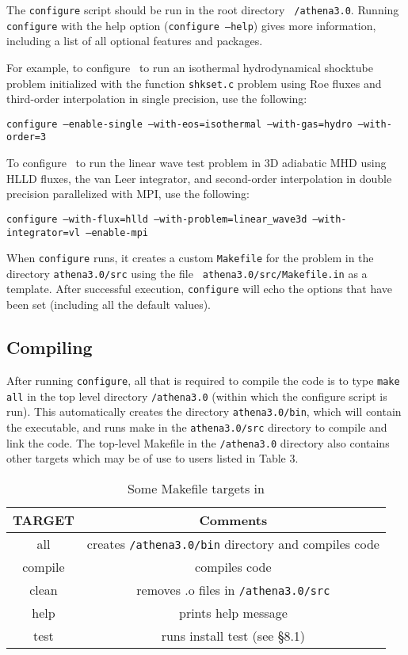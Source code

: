 The {\tt configure} script should be run in the root directory {\tt
/athena3.0}.  Running {\tt configure} with the help option ({\tt configure
--help}) gives more information, including a list of all optional features
and packages.

For example, to configure \ath\ to run an isothermal hydrodynamical shocktube
problem initialized with the function {\tt shkset.c} problem
using Roe fluxes and third-order interpolation in single precision, use the
following:
\begin{center}
{\tt configure --enable-single --with-eos=isothermal --with-gas=hydro --with-order=3}
\end{center}

To configure \ath\ to run the linear wave test problem in 3D adiabatic
MHD using HLLD fluxes, the van Leer integrator, and second-order interpolation in double precision
parallelized with MPI, use the following:
\begin{center}
{\tt configure --with-flux=hlld --with-problem=linear\_wave3d --with-integrator=vl --enable-mpi}
\end{center}

When {\tt configure} runs, it creates a custom {\tt Makefile} for the
problem in the directory {\tt athena3.0/src} using the file {\tt
athena3.0/src/Makefile.in} as a template.  After successful execution,
{\tt configure} will echo the options that have been set (including all
the default values).

\subsection{Compiling \ath}

After running {\tt configure}, all that is required to compile the code
is to type {\tt make all} in the top level directory {\tt /athena3.0}
(within which the configure script is run).  This automatically creates
the directory {\tt athena3.0/bin}, which will contain the executable,
and runs make in the {\tt athena3.0/src} directory to compile and link
the code.  The top-level Makefile in the {\tt /athena3.0} directory also
contains other targets which may be of use to users listed in Table 3.

\begin{table}[ht]
\caption{Some Makefile targets in \ath}
\begin{tabular}{|c|c|} \hline \hline
TARGET & Comments \\ \hline
all & creates {\tt /athena3.0/bin} directory and compiles code \\
compile & compiles code \\
clean & removes .o files in {\tt /athena3.0/src} \\
help & prints help message \\
test & runs install test (see \S 8.1) \\
\hline
\end{tabular}
\end{table}


